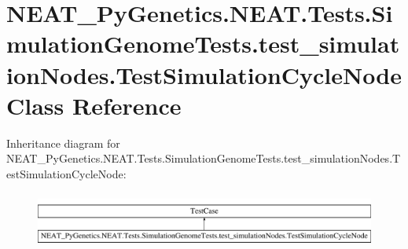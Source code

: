 \hypertarget{classNEAT__PyGenetics_1_1NEAT_1_1Tests_1_1SimulationGenomeTests_1_1test__simulationNodes_1_1TestSimulationCycleNode}{}\section{N\+E\+A\+T\+\_\+\+Py\+Genetics.\+N\+E\+A\+T.\+Tests.\+Simulation\+Genome\+Tests.\+test\+\_\+simulation\+Nodes.\+Test\+Simulation\+Cycle\+Node Class Reference}
\label{classNEAT__PyGenetics_1_1NEAT_1_1Tests_1_1SimulationGenomeTests_1_1test__simulationNodes_1_1TestSimulationCycleNode}
Inheritance diagram for N\+E\+A\+T\+\_\+\+Py\+Genetics.\+N\+E\+A\+T.\+Tests.\+Simulation\+Genome\+Tests.\+test\+\_\+simulation\+Nodes.\+Test\+Simulation\+Cycle\+Node\+:\begin{figure}[H]
\begin{center}
\leavevmode
\includegraphics[height=1.872910cm]{classNEAT__PyGenetics_1_1NEAT_1_1Tests_1_1SimulationGenomeTests_1_1test__simulationNodes_1_1TestSimulationCycleNode}
\end{center}
\end{figure}
